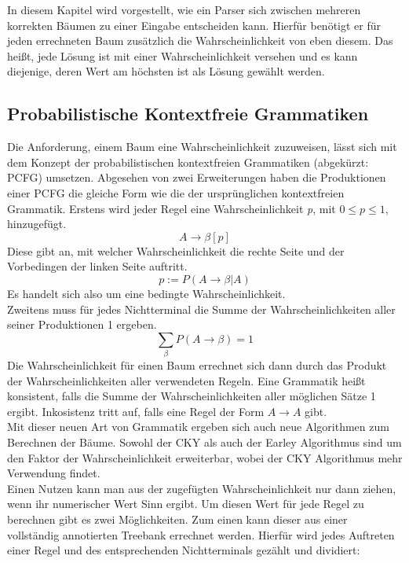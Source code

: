 In diesem Kapitel wird vorgestellt, wie ein Parser sich zwischen mehreren korrekten Bäumen zu einer Eingabe entscheiden kann. Hierfür benötigt er für jeden errechneten Baum zusätzlich die Wahrscheinlichkeit von eben diesem. Das heißt, jede Lösung ist mit einer Wahrscheinlichkeit versehen und es kann diejenige, deren Wert am höchsten ist als Lösung gewählt werden. %

\subsection{Probabilistische Kontextfreie Grammatiken}
\label{sec:nlp:stat-parsen:pcfg}

Die Anforderung, einem Baum eine Wahrscheinlichkeit zuzuweisen, lässt sich mit dem Konzept der probabilistischen kontextfreien Grammatiken (abgekürzt: PCFG) umsetzen. Abgesehen von zwei Erweiterungen haben die Produktionen einer PCFG die gleiche Form wie die der ursprünglichen kontextfreien Grammatik. Erstens wird jeder Regel eine Wahrscheinlichkeit \textit{p}, mit \( 0 \leq p \leq 1 \), hinzugefügt.
\[ A \to \beta  [p] \]
Diese gibt an, mit welcher Wahrscheinlichkeit die rechte Seite und der Vorbedingen der linken Seite auftritt.
\[ p := P(A \to \beta | A) \] 
Es handelt sich also um eine bedingte Wahrscheinlichkeit.\\ 
Zweitens muss für jedes Nichtterminal die Summe der Wahrscheinlichkeiten aller seiner Produktionen 1 ergeben.
\[ \sum_{\beta} P(A \to \beta) = 1 \] 
Die Wahrscheinlichkeit für einen Baum errechnet sich dann durch das Produkt der Wahrscheinlichkeiten aller verwendeten Regeln. Eine Grammatik heißt konsistent, falls die Summe der Wahrscheinlichkeiten aller möglichen Sätze 1 ergibt. Inkosistenz tritt auf, falls eine Regel der Form \( A \to A \) gibt.\\
Mit dieser neuen Art von Grammatik ergeben sich auch neue Algorithmen zum Berechnen der Bäume. Sowohl der CKY als auch der Earley Algorithmus sind um den Faktor der Wahrscheinlichkeit erweiterbar, wobei der CKY Algorithmus mehr Verwendung findet.\\ %
Einen Nutzen kann man aus der zugefügten Wahrscheinlichkeit nur dann ziehen, wenn ihr numerischer Wert Sinn ergibt. Um diesen Wert für jede Regel zu berechnen gibt es zwei Möglichkeiten. Zum einen kann dieser aus einer vollständig annotierten Treebank errechnet werden. Hierfür wird jedes Auftreten einer Regel und des entsprechenden Nichtterminals gezählt und dividiert: 
